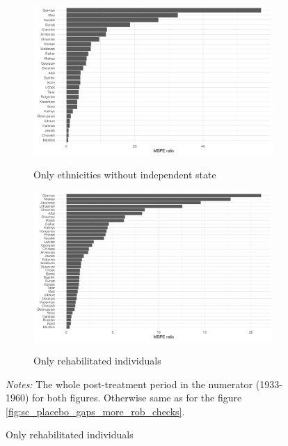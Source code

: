 \begin{figure}[H] 
\caption{Ratios of post-treatment MSPE to pre-treatment MSPE}
\begin{subfigure}{\textwidth}
\caption{Only ethnicities without independent state}
\includegraphics[width=\linewidth]{plots/final/mspe_ratios_ethnicities_without_ind_state.pdf}
\label{fig:sc_mspe_ratios_without_ind_state}
\end{subfigure}
\begin{subfigure}{\textwidth}
\caption{Only rehabilitated individuals}
\includegraphics[width=\linewidth]{plots/final/mspe_ratios_rehabs.pdf}
\label{fig:sc_mspe_ratios_rehabs}
\end{subfigure}
\label{fig:sc_mspe_ratios_more_rob_checks}
\begin{minipage}{0.92\textwidth}
\footnotesize
\emph{Notes:} The whole post-treatment period in the numerator (1933-1960) for both figures.  Otherwise same as for the figure \ref{fig:sc_placebo_gaps_more_rob_checks}.
\end{minipage}
\end{figure}